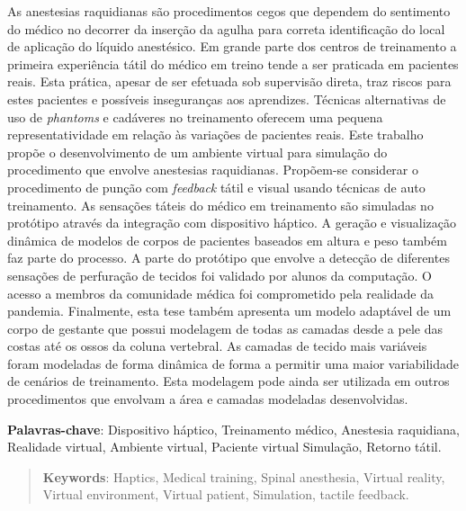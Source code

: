 \begin{resumo}

As anestesias raquidianas são procedimentos cegos que dependem do sentimento do médico no decorrer da inserção da agulha para correta identificação do local de aplicação do líquido anestésico. Em grande parte dos centros de treinamento a primeira experiência tátil do médico em treino tende a ser praticada em pacientes reais. Esta prática, apesar de ser efetuada sob supervisão direta, traz riscos para estes pacientes e possíveis inseguranças aos aprendizes. Técnicas alternativas de uso de \textit{phantoms} e cadáveres no treinamento oferecem uma pequena representatividade em relação às variações de pacientes reais. 
Este trabalho propõe o desenvolvimento de um ambiente virtual para simulação do procedimento que envolve anestesias raquidianas. Propõem-se considerar o procedimento de punção com \textit{feedback} tátil e visual usando técnicas de auto treinamento. As sensações táteis do médico em treinamento são simuladas no protótipo através da integração com dispositivo háptico. A geração e visualização dinâmica de modelos de corpos de pacientes baseados em altura e peso também faz parte do processo. A parte do protótipo que envolve a detecção de diferentes sensações de perfuração de tecidos foi validado por alunos da computação. O acesso a membros da comunidade médica foi comprometido pela realidade da pandemia. Finalmente, esta tese  também apresenta um modelo adaptável de um corpo de gestante que possui modelagem de todas as camadas desde a pele das costas até os ossos da coluna vertebral. As camadas de tecido mais variáveis foram modeladas de forma dinâmica de forma a permitir uma maior variabilidade de cenários de treinamento. Esta modelagem pode ainda ser utilizada em outros procedimentos que envolvam a área e camadas modeladas desenvolvidas. 

{\hspace{-8mm} \bf{Palavras-chave}}: Dispositivo háptico, Treinamento médico, Anestesia raquidiana, Realidade virtual, Ambiente virtual, Paciente virtual Simulação, Retorno tátil.

\end{resumo}

\begin{abstract}



{\hspace{-8mm} \bf{Keywords}}: Haptics, Medical training, Spinal anesthesia, Virtual reality, Virtual environment, Virtual patient, Simulation, tactile feedback.

\end{abstract}

